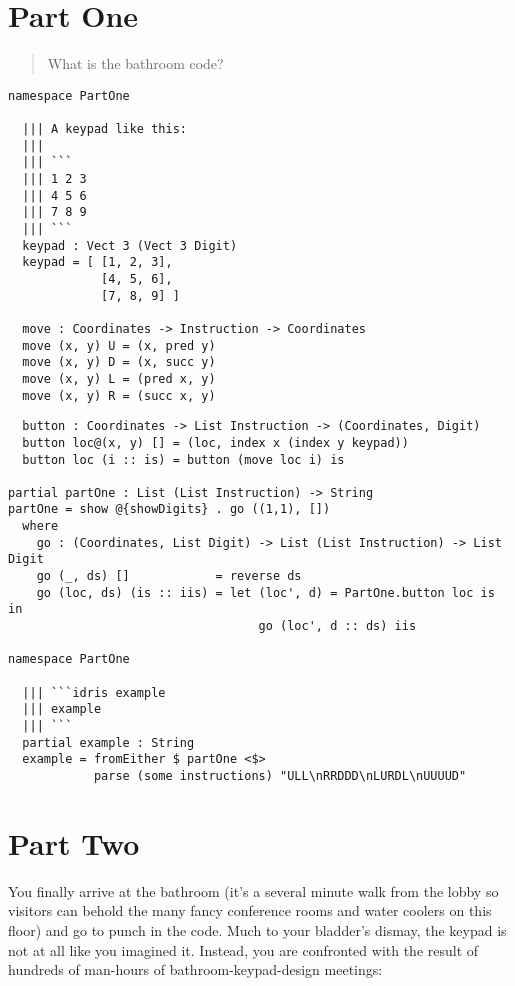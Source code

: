 \section{Part One}\label{part-one}

\begin{quote}
  What is the bathroom code?
\end{quote}

\begin{verbatim}
namespace PartOne

  ||| A keypad like this:
  |||
  ||| ```
  ||| 1 2 3
  ||| 4 5 6
  ||| 7 8 9
  ||| ```
  keypad : Vect 3 (Vect 3 Digit)
  keypad = [ [1, 2, 3],
             [4, 5, 6],
             [7, 8, 9] ]

  move : Coordinates -> Instruction -> Coordinates
  move (x, y) U = (x, pred y)
  move (x, y) D = (x, succ y)
  move (x, y) L = (pred x, y)
  move (x, y) R = (succ x, y)
\end{verbatim}

\newpage

\begin{verbatim}
  button : Coordinates -> List Instruction -> (Coordinates, Digit)
  button loc@(x, y) [] = (loc, index x (index y keypad))
  button loc (i :: is) = button (move loc i) is

partial partOne : List (List Instruction) -> String
partOne = show @{showDigits} . go ((1,1), [])
  where
    go : (Coordinates, List Digit) -> List (List Instruction) -> List Digit
    go (_, ds) []            = reverse ds
    go (loc, ds) (is :: iis) = let (loc', d) = PartOne.button loc is in
                                   go (loc', d :: ds) iis

namespace PartOne

  ||| ```idris example
  ||| example
  ||| ```
  partial example : String
  example = fromEither $ partOne <$>
            parse (some instructions) "ULL\nRRDDD\nLURDL\nUUUUD"
\end{verbatim}

\section{Part Two}\label{part-two}

You finally arrive at the bathroom (it's a several minute walk from the
lobby so visitors can behold the many fancy conference rooms and water
coolers on this floor) and go to punch in the code. Much to your
bladder's dismay, the keypad is not at all like you imagined it.
Instead, you are confronted with the result of hundreds of man-hours of
bathroom-keypad-design meetings:

